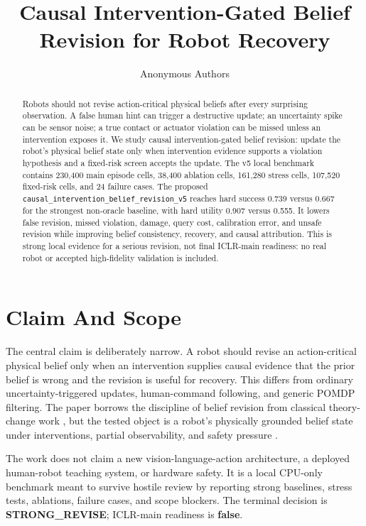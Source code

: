 \documentclass{article}
\title{Causal Intervention-Gated Belief Revision for Robot Recovery}
\author{Anonymous Authors}
\begin{document}
\maketitle

\begin{abstract}
Robots should not revise action-critical physical beliefs after every surprising observation. A false human hint can trigger a destructive update; an uncertainty spike can be sensor noise; a true contact or actuator violation can be missed unless an intervention exposes it. We study causal intervention-gated belief revision: update the robot's physical belief state only when intervention evidence supports a violation hypothesis and a fixed-risk screen accepts the update. The v5 local benchmark contains 230,400 main episode cells, 38,400 ablation cells, 161,280 stress cells, 107,520 fixed-risk cells, and 24 failure cases. The proposed \texttt{causal\_intervention\_belief\_revision\_v5} reaches hard success 0.739 versus 0.667 for the strongest non-oracle baseline, with hard utility 0.907 versus 0.555. It lowers false revision, missed violation, damage, query cost, calibration error, and unsafe revision while improving belief consistency, recovery, and causal attribution. This is strong local evidence for a serious revision, not final ICLR-main readiness: no real robot or accepted high-fidelity validation is included.
\end{abstract}

\section{Claim And Scope}
The central claim is deliberately narrow. A robot should revise an action-critical physical belief only when an intervention supplies causal evidence that the prior belief is wrong and the revision is useful for recovery. This differs from ordinary uncertainty-triggered updates, human-command following, and generic POMDP filtering. The paper borrows the discipline of belief revision from classical theory-change work \citep{agm1985}, but the tested object is a robot's physically grounded belief state under interventions, partial observability, and safety pressure \citep{kaelbling1998pomdp,thrun2005probabilistic,ross2008pomdp}.

The work does not claim a new vision-language-action architecture, a deployed human-robot teaching system, or hardware safety. It is a local CPU-only benchmark meant to survive hostile review by reporting strong baselines, stress tests, ablations, failure cases, and scope blockers. The terminal decision is \textbf{STRONG\_REVISE}; ICLR-main readiness is \textbf{false}.
\end{document}

